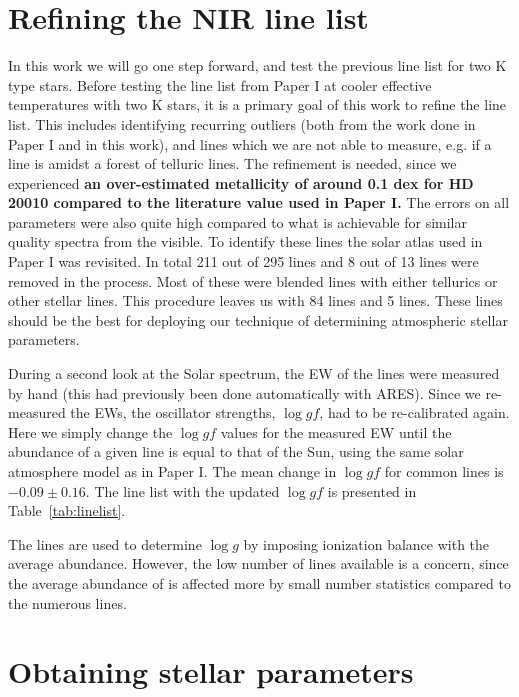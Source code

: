 \documentclass{aa}
\begin{document}
\section{Refining the NIR line list}
\label{sec:refining_the_line_list}

In this work we will go one step forward, and test the previous line list for two K type stars.
Before testing the line list from Paper I at cooler effective temperatures with two K stars, it is a
primary goal of this work to refine the line list. This includes identifying recurring outliers
(both from the work done in Paper I and in this work), and lines which we are not able to measure,
e.g. if a line is amidst a forest of telluric lines. The refinement is needed, since we experienced
{\bf an over-estimated metallicity of around 0.1 dex for HD 20010 compared to the literature value
used in Paper I.} The errors on all parameters were also quite high compared to what is achievable
for similar quality spectra from the visible. To identify these lines the solar atlas used in Paper
I was revisited. In total 211 out of 295  lines and 8 out of 13  lines were
removed in the process. Most of these were blended lines with either tellurics or other stellar
lines. This procedure leaves us with 84  lines and 5  lines. These lines
should be the best for deploying our technique of determining atmospheric stellar parameters.

During a second look at the Solar spectrum, the EW of the lines were measured by
hand (this had previously been done automatically with ARES). Since we
re-measured the EWs, the oscillator strengths, $\log \mathit{gf}$, had to be
re-calibrated again. Here we simply change the $\log \mathit{gf}$ values for the
measured EW until the abundance of a given line is equal to that of the Sun,
using the same solar atmosphere model as in Paper I. The mean change in $\log
\mathit{gf}$ for common lines is $-0.09 \pm 0.16$. The line list with the
updated $\log \mathit{gf}$ is presented in Table~\ref{tab:linelist}.

The  lines are used to determine $\log g$ by imposing ionization
balance with the average  abundance. However, the low number of
 lines available is a concern, since the average abundance of
 is affected more by small number statistics compared to the
numerous  lines.


\section{Obtaining stellar parameters}
\label{sec:method}
\end{document}
